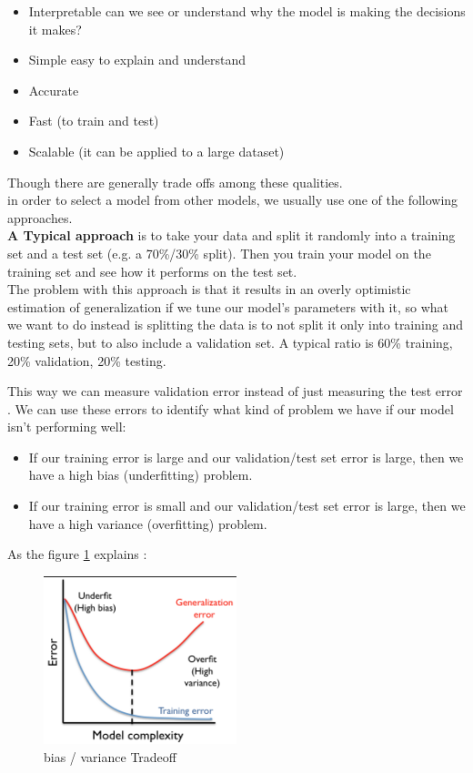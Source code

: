 \begin{itemize}
\item Interpretable   can we see or understand why the model is making the decisions it makes?
\item Simple   easy to explain and understand
\item Accurate
\item Fast (to train and test)
\item Scalable (it can be applied to a large dataset)

\end{itemize}
Though there are generally trade offs among these qualities.\\in order to select a model from other models, we usually use one of the following approaches.\\\textbf{A Typical approach } is to take your data and split it randomly into a training set and a test set (e.g. a 70\%/30\% split). Then you train your model on the training set and see how it performs on the test set.\\The problem with this approach is that it results in an overly optimistic estimation of generalization if we tune our model's parameters with it,  so what we want to do instead is splitting the data is to not split it only into training and testing sets, but to also include a validation set. A typical ratio is 60\% training, 20\% validation, 20\% testing.

This way we can measure validation error instead of just measuring the test error .
We can use these errors   to identify what kind of problem we have if our model isn't performing well:

\begin{itemize}
\item If our training error is large and our validation/test set error is large, then we have a high bias (underfitting) problem.
\item If our training error is small and our validation/test set error is large, then we have a high variance (overfitting) problem.
\end{itemize}
As the figure \ref{fig:bias} explains : 

\begin{figure}[H]
\centering
\includegraphics[width=0.5\textwidth]{img/model.png}
\caption{ bias / variance Tradeoff}
\label{fig:bias}
\end{figure}

